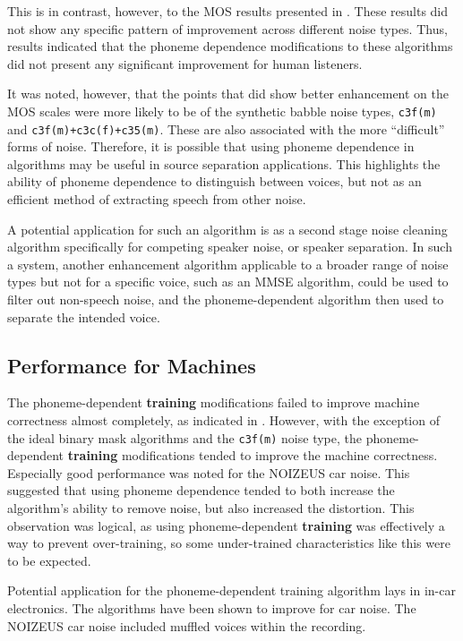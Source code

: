 This is in contrast, however, to the \ac{MOS} results presented in
.
These results did not show any specific pattern of improvement across
different noise types. Thus, results indicated that the phoneme dependence
modifications to these algorithms did not present any significant
improvement for human listeners.

It was noted, however, that the points that did show better enhancement
on the \ac{MOS} scales were more likely to be of the synthetic babble
noise types, \lstinline!c3f(m)! and \lstinline!c3f(m)+c3c(f)+c35(m)!.
These are also associated with the more ``difficult'' forms of noise.
Therefore, it is possible that using phoneme dependence in algorithms
may be useful in source separation applications. This highlights the
ability of phoneme dependence to distinguish between voices, but not
as an efficient method of extracting speech from other noise.

A potential application for such an algorithm is as a second stage
noise cleaning algorithm specifically for competing speaker noise,
or speaker separation. In such a system, another enhancement algorithm
applicable to a broader range of noise types but not for a specific
voice, such as an \ac{MMSE} algorithm, could be used to filter out
non-speech noise, and the phoneme-dependent algorithm then used to
separate the intended voice.


\subsection{Performance for Machines}

The phoneme-dependent \textbf{training} modifications failed to improve
machine correctness almost completely, as indicated in .
However, with the exception of the ideal binary mask algorithms and
the \lstinline!c3f(m)! noise type, the phoneme-dependent \textbf{training}
modifications tended to improve the machine correctness. Especially
good performance was noted for the NOIZEUS car noise. This suggested
that using phoneme dependence tended to both increase the algorithm's
ability to remove noise, but also increased the distortion. This observation
was logical, as using phoneme-dependent \textbf{training} was effectively
a way to prevent over-training, so some under-trained characteristics
like this were to be expected.

Potential application for the phoneme-dependent training algorithm
lays in in-car electronics. The algorithms have been shown to improve
for car noise. The NOIZEUS car noise included muffled voices within
the recording.

